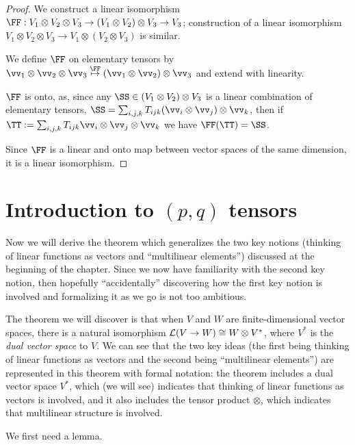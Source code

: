 \begin{proof}
    We construct a linear isomorphism $\FF:V_1 \otimes V_2 \otimes V_3 \rightarrow (V_1 \otimes V_2) \otimes V_3 \rightarrow V_3$; construction of a linear isomorphism $V_1 \otimes V_2 \otimes V_3 \rightarrow V_1 \otimes (V_2 \otimes V_3)$ is similar.

    We define $\FF$ on elementary tensors by $\vv_1 \otimes \vv_2 \otimes \vv_3 \overset{\FF}{\mapsto} (\vv_1 \otimes \vv_2) \otimes \vv_3$ and extend with linearity.
    
    $\FF$ is onto, as, since any ${\SS \in (V_1 \otimes V_2) \otimes V_3}$ is a linear combination of elementary tensors, $\SS = \sum_{i, j, k} T_{ijk} (\vv_i \otimes \vv_j) \otimes \vv_k$, then if $\TT := \sum_{i,j,k} T_{ijk} \vv_i \otimes \vv_j \otimes \vv_k$ we have $\FF(\TT) = \SS$.

    Since $\FF$ is a linear and onto map between vector spaces of the same dimension, it is a linear isomorphism.    
\end{proof}

\newpage

\section{Introduction to $(p, q)$ tensors}
\label{ch::motivated_intro::sec::motivated_intro}

Now we will derive the theorem which generalizes the two key notions (thinking of linear functions as vectors and ``multilinear elements'') discussed at the beginning of the chapter. Since we now have familiarity with the second key notion, then hopefully ``accidentally'' discovering how the first key notion is involved and formalizing it as we go is not too ambitious.

The theorem we will discover is that when $V$ and $W$ are finite-dimensional vector spaces, there is a natural isomorphism $\mathcal{L}(V \rightarrow W) \cong W \otimes V^*$, where $V^*$ is the \textit{dual vector space} to $V$. We can see that the two key ideas (the first being thinking of linear functions as vectors and the second being ``multilinear elements'') are represented in this theorem with formal notation: the theorem includes a dual vector space $V^*$, which (we will see) indicates that thinking of linear functions as vectors is involved, and it also includes the tensor product $\otimes$, which indicates that multilinear structure is involved.

We first need a lemma.

